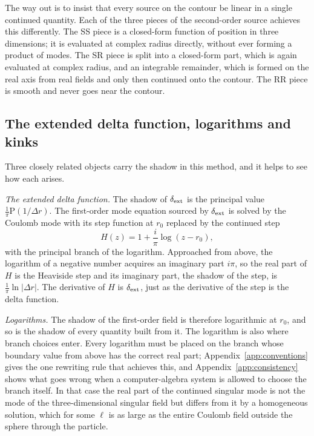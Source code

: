 \documentclass[aps,prd,twocolumn,superscriptaddress,nofootinbib,floatfix]{revtex4-2}
\newcommand{\dext}{\delta_{\rm ext}}
\begin{document}
The way out is to insist that every source on the contour be linear in a single continued quantity.
Each of the three pieces of the second-order source achieves this differently.
The SS piece is a closed-form function of position in three dimensions; it is evaluated at complex radius directly, without ever forming a product of modes.
The SR piece is split into a closed-form part, which is again evaluated at complex radius, and an integrable remainder, which is formed on the real axis from real fields and only then continued onto the contour.
The RR piece is smooth and never goes near the contour.

\subsection{The extended delta function, logarithms and kinks}\label{sec:kinks}

Three closely related objects carry the shadow in this method, and it helps to see how each arises.

\emph{The extended delta function.}
The shadow of $\dext$ is the principal value $\tfrac1\pi\mathrm{P}(1/\Delta r)$.
The first-order mode equation sourced by $\dext$ is solved by the Coulomb mode with its step function at $r_0$ replaced by the continued step
\begin{equation}
H(z)=1+\frac{i}{\pi}\log(z-r_0),
\label{eq:H}
\end{equation}
with the principal branch of the logarithm.
Approached from above, the logarithm of a negative number acquires an imaginary part $i\pi$, so the real part of $H$ is the Heaviside step and its imaginary part, the shadow of the step, is $\tfrac1\pi\ln|\Delta r|$.
The derivative of $H$ is $\dext$, just as the derivative of the step is the delta function.

\emph{Logarithms.}
The shadow of the first-order field is therefore logarithmic at $r_0$, and so is the shadow of every quantity built from it.
The logarithm is also where branch choices enter.
Every logarithm must be placed on the branch whose boundary value from above has the correct real part; Appendix~\ref{app:conventions} gives the one rewriting rule that achieves this, and Appendix~\ref{app:consistency} shows what goes wrong when a computer-algebra system is allowed to choose the branch itself.
In that case the real part of the continued singular mode is not the mode of the three-dimensional singular field but differs from it by a homogeneous solution, which for some $\ell$ is as large as the entire Coulomb field outside the sphere through the particle.
\end{document}
